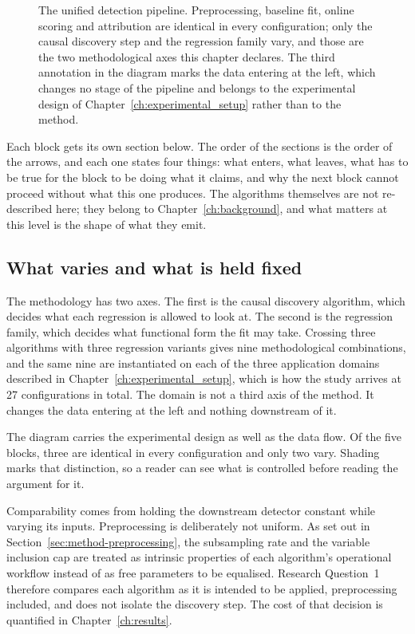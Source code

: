 \begin{figure}[htbp]
  \centering
  \resizebox{\textwidth}{!}{}
  \caption[The unified detection pipeline]{The unified detection pipeline. Preprocessing, baseline fit, online scoring and attribution are identical in every configuration; only the causal discovery step and the regression family vary, and those are the two methodological axes this chapter declares. The third annotation in the diagram marks the data entering at the left, which changes no stage of the pipeline and belongs to the experimental design of Chapter~\ref{ch:experimental_setup} rather than to the method.}
  \label{fig:architecture}
\end{figure}

Each block gets its own section below. The order of the sections is the order of the arrows, and each one states four things: what enters, what leaves, what has to be true for the block to be doing what it claims, and why the next block cannot proceed without what this one produces. The algorithms themselves are not re-described here; they belong to Chapter~\ref{ch:background}, and what matters at this level is the shape of what they emit.

\subsection{What varies and what is held fixed}

The methodology has two axes. The first is the causal discovery algorithm, which decides what each regression is allowed to look at. The second is the regression family, which decides what functional form the fit may take. Crossing three algorithms with three regression variants gives nine methodological combinations, and the same nine are instantiated on each of the three application domains described in Chapter~\ref{ch:experimental_setup}, which is how the study arrives at 27 configurations in total. The domain is not a third axis of the method. It changes the data entering at the left and nothing downstream of it.

The diagram carries the experimental design as well as the data flow. Of the five blocks, three are identical in every configuration and only two vary. Shading marks that distinction, so a reader can see what is controlled before reading the argument for it.

Comparability comes from holding the downstream detector constant while varying its inputs. Preprocessing is deliberately not uniform. As set out in Section~\ref{sec:method-preprocessing}, the subsampling rate and the variable inclusion cap are treated as intrinsic properties of each algorithm's operational workflow instead of as free parameters to be equalised. Research Question~1 therefore compares each algorithm as it is intended to be applied, preprocessing included, and does not isolate the discovery step. The cost of that decision is quantified in Chapter~\ref{ch:results}.

